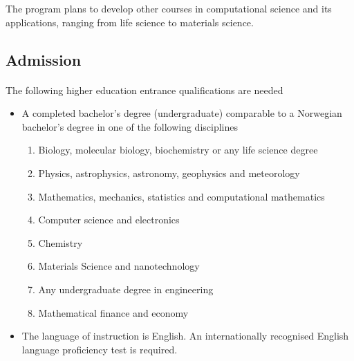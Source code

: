\documentclass[%
twoside,                 %
final,                   %
10pt]{article}
\begin{document}
\noindent
The program plans to develop other courses in computational science and its applications, ranging from life science to materials science.







\subsection*{Admission}

\paragraph{}
The following higher education entrance qualifications are needed

\begin{itemize}
\item A completed bachelor's degree (undergraduate) comparable to a Norwegian bachelor's degree in one of the following disciplines
\begin{enumerate}

 \item Biology, molecular biology, biochemistry  or any life science degree

 \item Physics, astrophysics, astronomy, geophysics and meteorology

 \item Mathematics, mechanics, statistics and computational mathematics

 \item Computer science and electronics

 \item Chemistry

 \item Materials Science and nanotechnology

 \item Any undergraduate degree in engineering

 \item Mathematical finance and economy

\end{enumerate}

\noindent
\item The language of instruction is English. An internationally recognised English language proficiency test is required.
\end{itemize}
\end{document}
